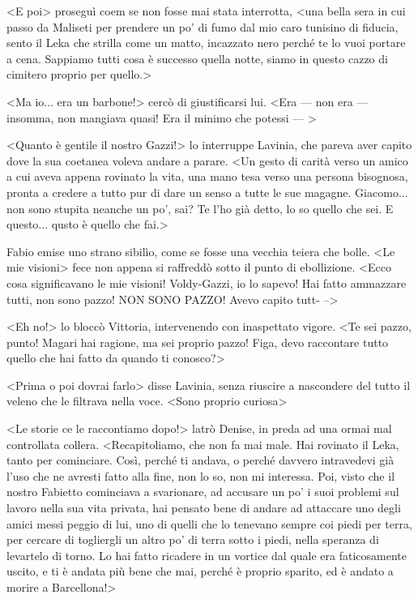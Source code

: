 <E poi> proseguì coem se non fosse mai stata interrotta, <una bella sera in cui passo da Maliseti per prendere un po' di fumo dal mio caro tunisino di fiducia, sento il Leka che strilla come un matto, incazzato nero perché te lo vuoi portare a cena. Sappiamo tutti cosa è successo quella notte, siamo in questo cazzo di cimitero proprio per quello.>

<Ma io... era un barbone!> cercò di giustificarsi lui. <Era --- non era --- insomma, non mangiava quasi! Era il minimo che potessi --- >

<Quanto è gentile il nostro Gazzi!> lo interruppe Lavinia, che pareva aver capito dove la sua coetanea voleva andare a parare. <Un gesto di carità verso un amico a cui aveva appena rovinato la vita, una mano tesa verso una persona bisognosa, pronta a credere a tutto pur di dare un senso a tutte le sue magagne. Giacomo... non sono stupita neanche un po', sai? Te l'ho già detto, lo so quello che sei. E questo... qusto è quello che fai.>

Fabio emise uno strano sibilìo, come se fosse una vecchia teiera che bolle. <Le mie visioni> fece non appena si raffreddò sotto il punto di ebollizione. <Ecco cosa significavano le mie visioni! Voldy-Gazzi, io lo sapevo! Hai fatto ammazzare tutti, non sono pazzo! NON SONO PAZZO! Avevo capito tutt- -->

<Eh no!> lo bloccò Vittoria, intervenendo con inaspettato vigore. <Te sei pazzo, punto! Magari hai ragione, ma sei proprio pazzo! Figa, devo raccontare tutto quello che hai fatto da quando ti conosco?>

<Prima o poi dovrai farlo> disse Lavinia, senza riuscire a nascondere del tutto il veleno che le filtrava nella voce. <Sono proprio curiosa>

<Le storie ce le raccontiamo dopo!> latrò Denise, in preda ad una ormai mal controllata collera. <Recapitoliamo, che non fa mai male. Hai rovinato il Leka, tanto per cominciare. Così, perché ti andava, o perché davvero intravedevi già l'uso che ne avresti fatto alla fine, non lo so, non mi interessa. Poi, visto che il nostro Fabietto cominciava a svarionare, ad accusare un po' i suoi problemi sul lavoro nella sua vita privata, hai pensato bene di andare ad attaccare uno degli amici messi peggio di lui, uno di quelli che lo tenevano sempre coi piedi per terra, per cercare di togliergli un altro po' di terra sotto i piedi, nella speranza di levartelo di torno. Lo hai fatto ricadere in un vortice dal quale era faticosamente uscito, e ti è andata più bene che mai, perché è proprio sparito, ed è andato a morire a Barcellona!>

